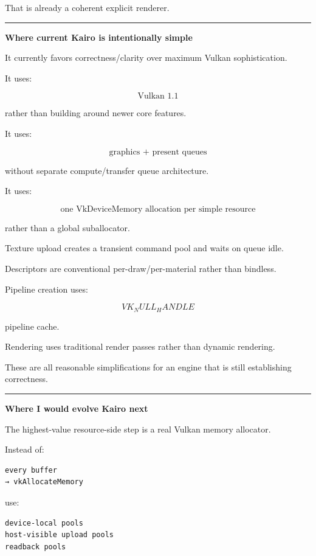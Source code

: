 That is already a coherent explicit renderer.

\begin{center}\rule{0.5\linewidth}{0.5pt}\end{center}

\textbf{Where current Kairo is intentionally simple}

It currently favors correctness/clarity over maximum Vulkan sophistication.

It uses:

\[
\boxed{
\text{Vulkan 1.1}
}
\]

rather than building around newer core features.

It uses:

\[
\boxed{
\text{graphics + present queues}
}
\]

without separate compute/transfer queue architecture.

It uses:

\[
\boxed{
\text{one VkDeviceMemory allocation per simple resource}
}
\]

rather than a global suballocator.

Texture upload creates a transient command pool and waits on queue idle.

Descriptors are conventional per-draw/per-material rather than bindless.

Pipeline creation uses:

\[
VK_NULL_HANDLE
\]

pipeline cache.

Rendering uses traditional render passes rather than dynamic rendering.

These are all reasonable simplifications for an engine that is still establishing correctness.

\begin{center}\rule{0.5\linewidth}{0.5pt}\end{center}

\textbf{Where I would evolve Kairo next}

The highest-value resource-side step is a real Vulkan memory allocator.

Instead of:

\begin{verbatim}
every buffer
→ vkAllocateMemory
\end{verbatim}

use:

\begin{verbatim}
device-local pools
host-visible upload pools
readback pools
\end{verbatim}

